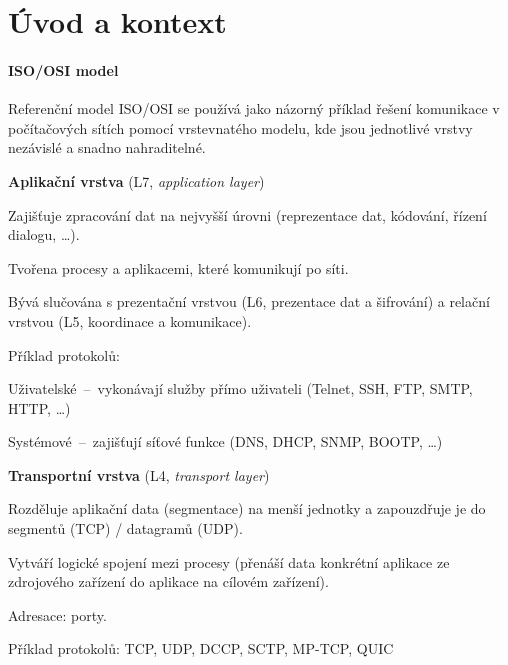 
\section{Úvod a kontext}


\paragraph*{ISO/OSI model} Referenční model ISO/OSI se používá jako názorný příklad řešení komunikace v počítačových sítích pomocí vrstevnatého modelu, kde jsou jednotlivé vrstvy nezávislé a snadno nahraditelné. \begin{compactitem}

    \item \textbf{Aplikační vrstva} (L7, \textit{application layer}) \begin{compactitem}
        \item Zajišťuje zpracování dat na nejvyšší úrovni (reprezentace dat, kódování, řízení dialogu, \dots).
        \item Tvořena procesy a aplikacemi, které komunikují po síti.
        \item Bývá slučována s prezentační vrstvou (L6, prezentace dat a šifrování) a relační vrstvou (L5, koordinace a komunikace).
        \item Příklad protokolů: \begin{compactitem}
            \item Uživatelské~--~vykonávají služby přímo uživateli (Telnet, SSH, FTP, SMTP, HTTP, \dots)
            \item Systémové~--~zajišťují síťové funkce (DNS, DHCP, SNMP, BOOTP, \dots)
        \end{compactitem}
    \end{compactitem}

    \item \textbf{Transportní vrstva} (L4, \textit{transport layer}) \begin{compactitem}
        \item Rozděluje aplikační data (segmentace) na menší jednotky a zapouzdřuje je do segmentů (TCP) / datagramů (UDP).
        \item Vytváří logické spojení mezi procesy (přenáší data konkrétní aplikace ze zdrojového zařízení do aplikace na cílovém zařízení).
        \item Adresace: porty.
        \item Příklad protokolů: TCP, UDP, DCCP, SCTP, MP-TCP, QUIC
    \end{compactitem}


\end{compactitem}
